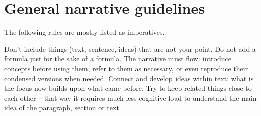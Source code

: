 \documentclass[10pt,a4paper,twocolumn]{article}
\begin{document}

\section{General narrative guidelines} %
\label{sec:general_narrative_guidelines}

The following rules are mostly listed as imperatives.

Don't include things (text, sentence, ideas) that are not your point. Do not add a formula
just for the sake of a formula. The narrative must flow: introduce concepts before using
them, refer to them as necessary, or even reproduce their condensed versions when needed.
Connect and develop ideas within text: what is the focus now builds upon what came before.
Try to keep related things close to each other -- that way it requires much less cognitive
load to understand the main idea of the paragraph, section or text.

\end{document}

